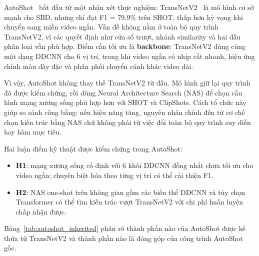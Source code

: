 AutoShot~\cite{zhu2023autoshot} bắt đầu từ một nhận xét thực nghiệm: TransNetV2~\cite{soucek2020transnetv2} là mô hình cơ sở mạnh cho SBD, nhưng chỉ đạt F1 = 79.9\% trên SHOT, thấp hơn kỳ vọng khi chuyển sang miền video ngắn. Vấn đề không nằm ở toàn bộ quy trình TransNetV2, vì các quyết định như cửa sổ trượt, nhánh similarity và hai đầu phân loại vẫn phù hợp. Điểm cần tối ưu là \textbf{backbone}: TransNetV2 dùng cùng một dạng DDCNN cho 6 vị trí, trong khi video ngắn có nhịp cắt nhanh, hiệu ứng chỉnh màu dày đặc và phân phối chuyển cảnh khác video dài.

Vì vậy, AutoShot không thay thế TransNetV2 từ đầu. Mô hình giữ lại quy trình đã được kiểm chứng, rồi dùng Neural Architecture Search (NAS) để chọn cấu hình mạng xương sống phù hợp hơn với SHOT và ClipShots. Cách tổ chức này giúp so sánh công bằng: nếu hiệu năng tăng, nguyên nhân chính đến từ cơ chế chọn kiến trúc bằng NAS chứ không phải từ việc đổi toàn bộ quy trình suy diễn hay hàm mục tiêu.

Hai luận điểm kỹ thuật được kiểm chứng trong AutoShot:
\begin{itemize}
    \item \textbf{H1}: mạng xương sống cố định với 6 khối DDCNN đồng nhất chưa tối ưu cho video ngắn; chuyên biệt hóa theo từng vị trí có thể cải thiện F1.
    \item \textbf{H2}: NAS one-shot trên không gian gồm các biến thể DDCNN và tùy chọn Transformer có thể tìm kiến trúc vượt TransNetV2 với chi phí huấn luyện chấp nhận được.
\end{itemize}

Bảng~\ref{tab:autoshot_inherited} phân rõ thành phần nào của AutoShot được kế thừa từ TransNetV2 và thành phần nào là đóng góp của công trình AutoShot gốc.

